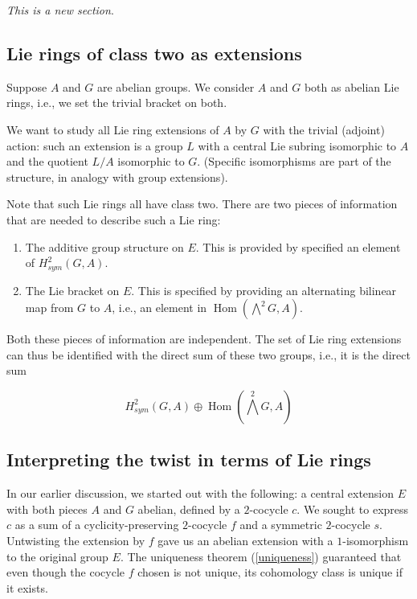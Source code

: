 \documentclass[10pt]{amsart}
\begin{document}
{\em This is a new section}.

\subsection{Lie rings of class two as extensions}

Suppose $A$ and $G$ are abelian groups. We consider $A$ and $G$ both
as abelian Lie rings, i.e., we set the trivial bracket on both.

We want to study all Lie ring extensions of $A$ by $G$ with the
trivial (adjoint) action: such an extension is a group $L$ with a
central Lie subring isomorphic to $A$ and the quotient $L/A$
isomorphic to $G$. (Specific isomorphisms are part of the structure,
in analogy with group extensions).

Note that such Lie rings all have class two. There are two pieces of
information that are needed to describe such a Lie ring:

\begin{enumerate}
\item The additive group structure on $E$. This is provided by
  specified an element of $H^2_{sym}(G,A)$.
\item The Lie bracket on $E$. This is specified by providing an
  alternating bilinear map from $G$ to $A$, i.e., an element in
  $\operatorname{Hom}(\bigwedge^2G,A)$.
\end{enumerate}

Both these pieces of information are independent. The set of Lie ring
extensions can thus be identified with the direct sum of these two
groups, i.e., it is the direct sum 

$$H^2_{sym}(G,A) \oplus \operatorname{Hom}(\bigwedge^2G,A)$$

\subsection{Interpreting the twist in terms of Lie rings}

In our earlier discussion, we started out with the following: a
central extension $E$ with both pieces $A$ and $G$ abelian, defined by
a $2$-cocycle $c$. We sought to express $c$ as a sum of a
cyclicity-preserving $2$-cocycle $f$ and a symmetric $2$-cocycle
$s$. Untwisting the extension by $f$ gave us an abelian extension with
a $1$-isomorphism to the original group $E$. The uniqueness theorem
(\ref{uniqueness}) guaranteed that even though the cocycle $f$ chosen
is not unique, its cohomology class is unique if it exists.
\end{document}
